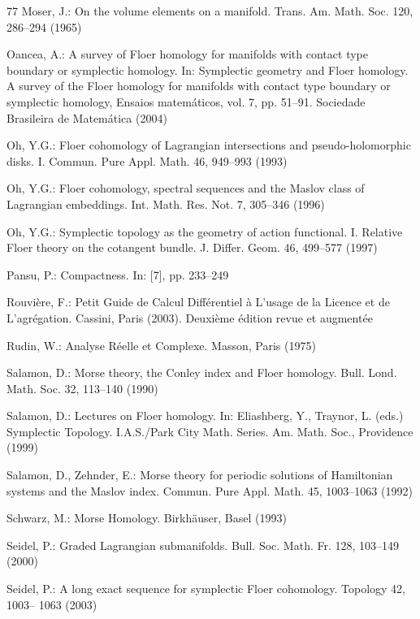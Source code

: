 \begin{thebibliography}{77}
 Moser, J.: On the volume elements on a manifold. Trans. Am. Math. Soc. 120, 286–294 (1965)

 Oancea, A.: A survey of Floer homology for manifolds with contact type boundary or symplectic homology. In: Symplectic geometry and Floer homology. A survey of the Floer homology for manifolds with contact type boundary or symplectic homology, Ensaios matemáticos, vol. 7, pp. 51–91. Sociedade Brasileira de Matemática (2004)

 Oh, Y.G.: Floer cohomology of Lagrangian intersections and pseudo-holomorphic disks. I. Commun. Pure Appl. Math. 46, 949–993 (1993)

 Oh, Y.G.: Floer cohomology, spectral sequences and the Maslov class of Lagrangian embeddings. Int. Math. Res. Not. 7, 305–346 (1996)

 Oh, Y.G.: Symplectic topology as the geometry of action functional. I. Relative Floer theory on the cotangent bundle. J. Differ. Geom. 46, 499–577 (1997)

 Pansu, P.: Compactness. In: [7], pp. 233–249

 Rouvière, F.: Petit Guide de Calcul Différentiel à L’usage de la Licence et de L’agrégation. Cassini, Paris (2003). Deuxième édition revue et augmentée

 Rudin, W.: Analyse Réelle et Complexe. Masson, Paris (1975)

 Salamon, D.: Morse theory, the Conley index and Floer homology. Bull. Lond. Math. Soc. 32, 113–140 (1990)

 Salamon, D.: Lectures on Floer homology. In: Eliashberg, Y., Traynor, L. (eds.) Symplectic Topology. I.A.S./Park City Math. Series. Am. Math. Soc., Providence (1999)

 Salamon, D., Zehnder, E.: Morse theory for periodic solutions of Hamiltonian systems and the Maslov index. Commun. Pure Appl. Math. 45, 1003–1063 (1992)

 Schwarz, M.: Morse Homology. Birkhäuser, Basel (1993)

 Seidel, P.: Graded Lagrangian submanifolds. Bull. Soc. Math. Fr. 128, 103–149 (2000)

 Seidel, P.: A long exact sequence for symplectic Floer cohomology. Topology 42, 1003– 1063 (2003)


\end{thebibliography}
